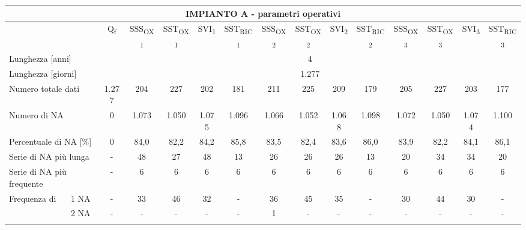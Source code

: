 \begin{sidewaystable}
\begin{center}
\scriptsize
	\begin{tabular}{|ll|c|c|c|c|c|c|c|c|c|c|c|c|c|}
		\hline
		\multicolumn{15}{|c|}{\textbf{IMPIANTO A - parametri operativi}}                                                                                                    \\ \hline
		\multicolumn{2}{|l|}{}                           & Q\textsubscript{f}   & SSS\textsubscript{OX1} & SST\textsubscript{OX1} & SVI\textsubscript{1}  & SST\textsubscript{RIC1} & SSS\textsubscript{OX2} & SST\textsubscript{OX2} & SVI\textsubscript{2}  & SST\textsubscript{RIC2} & SSS\textsubscript{OX3} & SST\textsubscript{OX3} & SVI\textsubscript{3}  & SST\textsubscript{RIC3} \\ \hline
		\multicolumn{2}{|l|}{Lunghezza {[}anni{]}}       & \multicolumn{13}{c|}{4}                                                                                          \\ \hline
		\multicolumn{2}{|l|}{Lunghezza {[}giorni{]}}     & \multicolumn{13}{c|}{1.277}                                                                                      \\ \hline
		\multicolumn{2}{|l|}{Numero totale dati}         & 1.277  & 204    & 227    & 202   & 181     & 211    & 225    & 209   & 179     & 205    & 227    & 203   & 177     \\ \hline
		\multicolumn{2}{|l|}{Numero di NA}               & 0  & 1.073  & 1.050  & 1.075 & 1.096   & 1.066  & 1.052  & 1.068 & 1.098   & 1.072  & 1.050  & 1.074 & 1.100   \\ \hline
		\multicolumn{2}{|l|}{Percentuale di NA {[}\%{]}} & 0 & 84,0   & 82,2   & 84,2  & 85,8    & 83,5   & 82,4   & 83,6  & 86,0    & 83,9   & 82,2   & 84,1  & 86,1    \\ \hline
		\multicolumn{2}{|l|}{Serie di NA più lunga}      & -   & 48     & 27     & 48    & 13      & 26     & 26     & 26    & 13      & 20     & 34     & 34    & 20      \\ \hline
		\multicolumn{2}{|l|}{Serie di NA più frequente}  & -    & 6      & 6      & 6     & 6       & 6      & 6      & 6     & 6       & 6      & 6      & 6     & 6       \\ \hline
		\multirow{17}{*}{Frequenza di}      & 1 NA       & -  & 33     & 46     & 32    & -       & 36     & 45     & 35    & -       & 30     & 44     & 30    & -       \\ \cline{3-15} 
		& 2 NA       & -   & -      & -      & -     & -       & 1      & -      & -     & -       & -      & -      & -     & -       \\ \cline{3-15} 

\end{tabular}
\end{center}
\end{sidewaystable}
